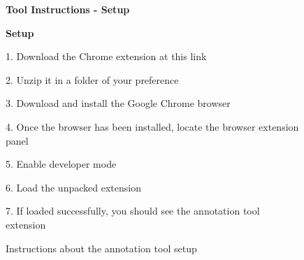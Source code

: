 

\begin{figure}
\begin{mdframed}[backgroundcolor=gray!04] 
\begin{scriptsize}

{\large \textbf{Tool Instructions - Setup}} \bigskip



{ \textbf{Setup}} \bigskip

1. Download the Chrome extension at this link \smallskip

2. Unzip it in a folder of your preference \smallskip

3. Download and install the Google Chrome browser \smallskip

4. Once the browser has been installed, locate the browser extension panel \smallskip

5. Enable developer mode \smallskip

6. Load the unpacked extension \smallskip

7. If loaded successfully, you should see the annotation tool extension

\end{scriptsize}
\end{mdframed}
\caption{Instructions about the annotation tool setup}
\end{figure}

    